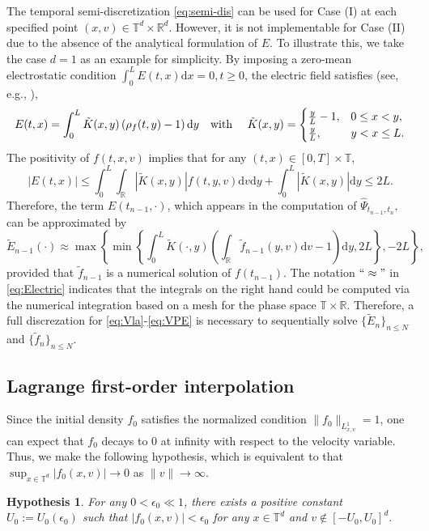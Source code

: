 \documentclass[11pt,reqno]{amsproc}
\newtheorem{hypothesis}[Def]{Hypothesis}
\newcommand{\ud}{\mathrm d}
\newcommand{\R}{\mathbb{R}}
\numberwithin{equation}{section}
\begin{document}
The temporal semi-discretization \eqref{eq:semi-dis} can be used for Case (I) at each specified point $(x,v)\in\mathbb{T}^d\times\R^d$. However, it is not implementable for Case (II) due to the absence of the analytical formulation of $E$. 
To illustrate this, we take the case $d=1$ as an example for simplicity. By imposing a zero-mean electrostatic condition
 $\int_0^L E(t,x)\ud x=0, t\ge0$,
 the electric field satisfies (see, e.g., \cite{BN04}),
\begin{equation*}
	E(t,x)=\int_{0}^L \tilde{K}(x,y)\left(\rho_f(t,y)-1\right)\ud y \text{\quad with
		\quad}\tilde{K}(x,y)=\begin{cases}\frac{y}{L}-1,& 0\le x<y,\\
		\frac{y}{L},& y<x\le L.
	\end{cases}
\end{equation*}
The positivity of $f(t,x,v)$ implies that for any $(t,x)\in[0,T]\times\mathbb{T}$,
$$|E(t,x)|\le \int_{0}^L\int_{\R}|\tilde{K}(x,y)|f(t,y,v)\ud v\ud y+\int_{0}^L|\tilde{K}(x,y)|\ud y\le 2L.$$
Therefore, the term $E(t_{n-1},\cdot)$, which appears in the computation of $\widehat{\Psi}_{t_{n-1},t_n},$ can be  approximated 
by
\begin{equation}\label{eq:Electric}
\widetilde{E}_{n-1}(\cdot)\approx\max\left\{\min\left\{\int_{0}^L \tilde{K}(\cdot,y)\left(\int_{\R}\widetilde{f}_{n-1}(y,v)\ud v-1\right)\ud y,2L\right\},-2L\right\},
\end{equation}
 provided that $\widetilde{f}_{n-1}$ is a numerical solution of $f(t_{n-1})$. 
 The notation $``\approx"$ in \eqref{eq:Electric} indicates that
 the integrals on the right hand could be computed via the numerical integration based on a mesh for the phase space $\mathbb{T}\times\R$. 
Therefore,  a full discrezation for \eqref{eq:Vla}-\eqref{eq:VPE} is necessary  to sequentially solve $\{\widetilde E_{n}\}_{n\le N}$ and $\{\widetilde{f}_{n}\}_{n\le N}$.


\subsection{Lagrange first-order interpolation}\label{S3.2}
Since the initial density $f_0$ satisfies the normalized condition $\|f_0\|_{L^1_{x,v}}=1$, one can expect that $f_0$
decays to $0$ at infinity with respect to the velocity variable. 
Thus, we make the following hypothesis, which is equivalent to that
$\sup_{x\in\mathbb{T}^d}|f_0(x,v)|\to 0$ as $\|v\|\to\infty$.
\begin{hypothesis}\label{Hyp:initial}
For any $0<\epsilon_0\ll 1$, there exists a positive constant $U_0:=U_0(\epsilon_0)$ such that 
$|f_0(x,v)|<\epsilon_0$ for any $x\in\mathbb T^d$ and 
$v\notin[-U_0,U_0]^d.$
\end{hypothesis}
\end{document}

